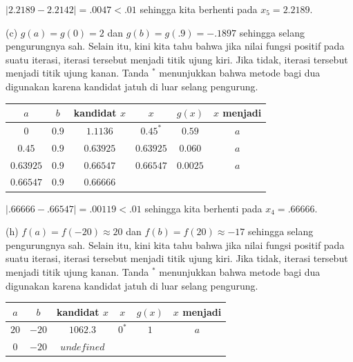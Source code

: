 \begin{description}
$|2.2189-2.2142|=.0047<.01$ sehingga kita berhenti pada $x_{5}=2.2189$.
\item [{\ref{exc:bracketing-1}:}] (c) $g(a)=g(0)=2$ dan $g(b)=g(.9)=-.1897$
sehingga selang pengurungnya sah. Selain itu, kini kita tahu bahwa
jika nilai fungsi positif pada suatu iterasi, iterasi tersebut menjadi
titik ujung kiri. Jika tidak, iterasi tersebut menjadi titik ujung
kanan. Tanda $^{*}$ menunjukkan bahwa metode bagi dua digunakan karena
kandidat jatuh di luar selang pengurung.

\begin{center}
\begin{tabular}{cccccc}
$a$ & $b$ & kandidat $x$ & $x$ & $g(x)$ & $x$ menjadi\tabularnewline
\hline 
$0$ & $0.9$ & $1.1136$ & $0.45^{*}$ & $0.59$ & $a$\tabularnewline
$0.45$ & $0.9$ & $0.63925$ & $0.63925$ & $0.060$ & $a$\tabularnewline
$0.63925$ & $0.9$ & $0.66547$ & $0.66547$ & $0.0025$ & $a$\tabularnewline
$0.66547$ & $0.9$ & $0.66666$ &  &  & \tabularnewline
\end{tabular}
\par\end{center}

$|.66666-.66547|=.00119<.01$ sehingga kita berhenti pada $x_{4}=.66666$.

(h) $f(a)=f(-20)\approx20$ dan $f(b)=f(20)\approx-17$ sehingga selang
pengurungnya sah. Selain itu, kini kita tahu bahwa jika nilai fungsi
positif pada suatu iterasi, iterasi tersebut menjadi titik ujung kiri.
Jika tidak, iterasi tersebut menjadi titik ujung kanan. Tanda $^{*}$
menunjukkan bahwa metode bagi dua digunakan karena kandidat jatuh
di luar selang pengurung.

\begin{center}
\begin{tabular}{cccccc}
$a$ & $b$ & kandidat $x$ & $x$ & $g(x)$ & $x$ menjadi\tabularnewline
\hline 
$20$ & $-20$ & $1062.3$ & $0^{*}$ & $1$ & $a$\tabularnewline
$0$ & $-20$ & $undefined$ &  &  & \tabularnewline
\end{tabular}
\par\end{center}


\end{description}

